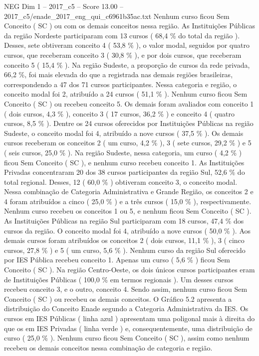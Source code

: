 \begin{textsample}{NEG Dim 1 – 2017\_c5 – Score 13.00 – 2017\_c5/enade\_2017\_eng\_qui\_c6961b35ac.txt}
Nenhum curso ficou Sem Conceito ( SC ) ou com os demais conceitos nessa região.
As Instituições Públicas da região Nordeste participaram com 13 cursos ( 68,4 \% do total da região ).
Desses, sete obtiveram conceito 4 ( 53,8 \% ), o valor modal, seguidos por quatro cursos, que receberam conceito 3 ( 30,8 \% ), e por dois cursos, que receberam conceito 5 ( 15,4 \% ).
Na região Sudeste, a proporção de cursos da rede privada, 66,2 \%, foi mais elevada do que a registrada nas demais regiões brasileiras, correspondendo a 47 dos 71 cursos participantes.
Nessa categoria e região, o conceito modal foi 2, atribuído a 24 cursos ( 51,1 \% ).
Nenhum curso ficou Sem Conceito ( SC ) ou recebeu conceito 5.
Os demais foram avaliados com conceito 1 ( dois cursos, 4,3 \% ), conceito 3 ( 17 cursos, 36,2 \% ) e conceito 4 ( quatro cursos, 8,5 \% ).
Dentre os 24 cursos oferecidos por Instituições Públicas na região Sudeste, o conceito modal foi 4, atribuído a nove cursos ( 37,5 \% ).
Os demais cursos receberam os conceitos 2 ( um curso, 4,2 \% ), 3 ( sete cursos, 29,2 \% ) e 5 ( seis cursos, 25,0 \% ).
Na região Sudeste, nessa categoria, um curso ( 4,2 \% ) ficou Sem Conceito ( SC ), e nenhum curso recebeu conceito 1.
As Instituições Privadas concentraram 20 dos 38 cursos participantes da região Sul, 52,6 \% do total regional.
Desses, 12 ( 60,0 \% ) obtiveram conceito 3, o conceito modal.
Nessa combinação de Categoria Administrativa e Grande Região, os conceitos 2 e 4 foram atribuídos a cinco ( 25,0 \% ) e a três cursos ( 15,0 \% ), respectivamente.
Nenhum curso recebeu os conceitos 1 ou 5, e nenhum ficou Sem Conceito ( SC ).
As Instituições Públicas na região Sul participaram com 18 cursos, 47,4 \% dos cursos da região.
O conceito modal foi 4, atribuído a nove cursos ( 50,0 \% ).
Aos demais cursos foram atribuídos os conceitos 2 ( dois cursos, 11,1 \% ), 3 ( cinco cursos, 27,8 \% ) e 5 ( um curso, 5,6 \% ).
Nenhum curso da região Sul oferecido por IES Pública recebeu conceito 1.
Apenas um curso ( 5,6 \% ) ficou Sem Conceito ( SC ).
Na região Centro-Oeste, os dois únicos cursos participantes eram de Instituições Públicas ( 100,0 \% em termos regionais ).
Um desses cursos recebeu conceito 3, e o outro, conceito 4.
Sendo assim, nenhum curso ficou Sem Conceito ( SC ) ou recebeu os demais conceitos.
O Gráfico 5.2 apresenta a distribuição do Conceito Enade segundo a Categoria Administrativa da IES.
Os cursos em IES Públicas ( linha azul ) apresentam uma poligonal mais à direita do que os em IES Privadas ( linha verde ) e, consequentemente, uma distribuição de curso ( 25,0 \% ).
Nenhum curso ficou Sem Conceito ( SC ), assim como nenhum recebeu os demais conceitos nessa combinação de categoria e região.

\end{textsample}
